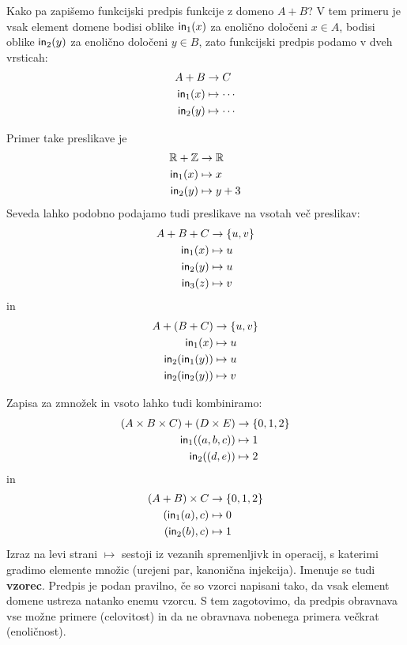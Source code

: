 Kako pa zapišemo funkcijski predpis funkcije z domeno $A + B$? V tem primeru je vsak element domene bodisi oblike
$\inl(x)$ za enolično določeni $x \in A$, bodisi oblike $\inr(y)$ za enolično določeni $y \in B$, zato funkcijski predpis podamo v dveh vrsticah:
%
\begin{align*}
    A + B &\to C \\
    \inl(x) &\mapsto \cdots \\
    \inr(y) &\mapsto \cdots
\end{align*}

\begin{primer}
  Primer take preslikave je
  \begin{align*}
    \RR + \ZZ &\to \RR \\
    \inl(x) &\mapsto x \\
    \inr(y) &\mapsto y + 3
  \end{align*}
  Seveda lahko podobno podajamo tudi preslikave na vsotah več preslikav:
  \begin{align*}
    A + B + C &\to \{u, v\} \\
    \inl(x) &\mapsto u \\
    \inr(y) &\mapsto u \\
    \inj[3](z) &\mapsto v
  \end{align*}
  in
  \begin{align*}
    A + (B + C) &\to \{u, v\} \\
    \inl(x) &\mapsto u \\
    \inr(\inl(y)) &\mapsto u \\
    \inr(\inr(y)) &\mapsto v
  \end{align*}
\end{primer}

Zapisa za zmnožek in vsoto lahko tudi kombiniramo:
%
\begin{align*}
  (A \times B \times C) + (D \times E) &\to \{0, 1, 2\} \\
  \inl((a, b, c)) &\mapsto 1 \\
  \inr((d, e)) &\mapsto 2
\end{align*}
%
in
\begin{align*}
  (A + B) \times C &\to \{0, 1, 2\} \\
  (\inl(a), c) &\mapsto 0 \\
  (\inr(b), c) &\mapsto 1
\end{align*}
%
Izraz na levi strani $\mapsto$ sestoji iz vezanih spremenljivk in operacij, s katerimi gradimo elemente množic (urejeni par, kanonična injekcija). Imenuje se tudi \textbf{vzorec}. Predpis je podan pravilno, če so vzorci napisani tako, da vsak element domene ustreza natanko enemu vzorcu.
%
S tem zagotovimo, da predpis obravnava vse možne primere (celovitost) in da ne obravnava nobenega primera večkrat (enoličnost).


